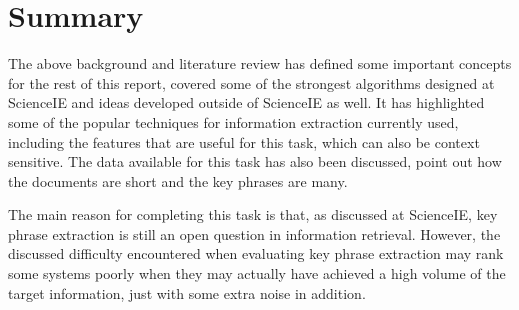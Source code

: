\section{Summary}
The above background and literature review has defined some important concepts for the rest of this report, covered some of the strongest algorithms designed at ScienceIE and ideas developed outside of ScienceIE as well. It has highlighted some of the popular techniques for information extraction currently used, including the features that are useful for this task, which can also be context sensitive. The data available for this task has also been discussed, point out how the documents are short and the key phrases are many.

The main reason for completing this task is that, as discussed at ScienceIE, key phrase extraction is still an open question in information retrieval. However, the discussed difficulty encountered when evaluating key phrase extraction may rank some systems poorly when they may actually have achieved a high volume of the target information, just with some extra noise in addition.
